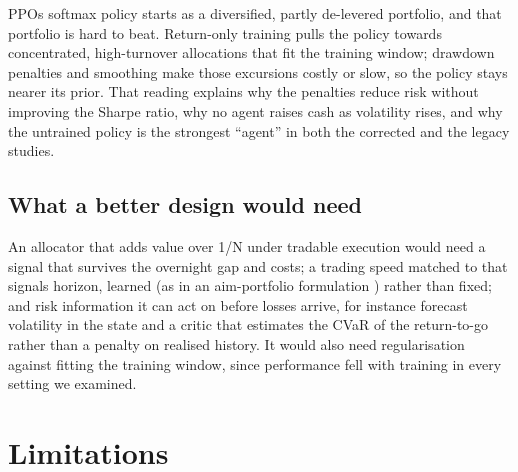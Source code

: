 \documentclass[11pt]{article}
\begin{document}
PPO\textquotesingle s softmax policy starts as a diversified, partly de-levered portfolio, and that portfolio is hard to beat. Return-only training pulls the policy towards concentrated, high-turnover allocations that fit the training window; drawdown penalties and smoothing make those excursions costly or slow, so the policy stays nearer its prior. That reading explains why the penalties reduce risk without improving the Sharpe ratio, why no agent raises cash as volatility rises, and why the untrained policy is the strongest ``agent'' in both the corrected and the legacy studies.

\subsection{What a better design would need}\label{what-a-better-design-would-need}

An allocator that adds value over 1/N under tradable execution would need a signal that survives the overnight gap and costs; a trading speed matched to that signal\textquotesingle s horizon, learned (as in an aim-portfolio formulation \cite{r46}) rather than fixed; and risk information it can act on before losses arrive, for instance forecast volatility in the state and a critic that estimates the CVaR of the return-to-go \cite{r20,r21,r54} rather than a penalty on realised history. It would also need regularisation against fitting the training window, since performance fell with training in every setting we examined.

\section{Limitations}\label{s10}
\end{document}
